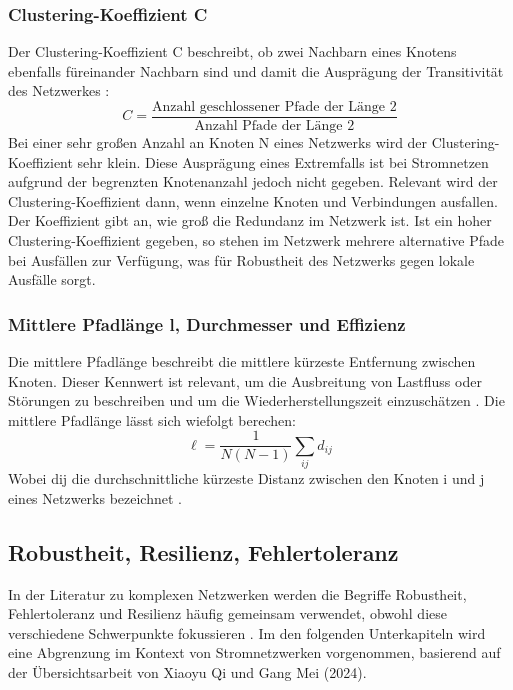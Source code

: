 \subsubsection{Clustering-Koeffizient C} 
Der Clustering-Koeffizient C beschreibt, ob zwei Nachbarn eines Knotens ebenfalls füreinander Nachbarn sind  und damit die Ausprägung der Transitivität des Netzwerkes : 
\[
C = \frac{\text{Anzahl geschlossener Pfade der L\"ange 2}}{\text{Anzahl Pfade der L\"ange 2}}
\]
Bei einer sehr großen Anzahl an Knoten N eines Netzwerks wird der Clustering-Koeffizient sehr klein. Diese Ausprägung eines Extremfalls ist bei Stromnetzen aufgrund der begrenzten Knotenanzahl jedoch nicht gegeben. Relevant wird der Clustering-Koeffizient dann, wenn einzelne Knoten und Verbindungen ausfallen. Der Koeffizient gibt an, wie groß die Redundanz im Netzwerk ist. Ist ein hoher Clustering-Koeffizient gegeben, so stehen im Netzwerk mehrere alternative Pfade bei Ausfällen zur Verfügung, was für Robustheit des Netzwerks gegen lokale Ausfälle sorgt. 
\subsubsection{Mittlere Pfadlänge l, Durchmesser und Effizienz}
Die mittlere Pfadlänge beschreibt die mittlere kürzeste Entfernung zwischen Knoten. Dieser Kennwert ist relevant, um die Ausbreitung von Lastfluss oder Störungen zu beschreiben und um die Wiederherstellungszeit einzuschätzen . Die mittlere Pfadlänge lässt sich wiefolgt berechen:
\[
\ell = \frac{1}{N(N-1)} \sum_{i j} d_{i j}
\]
Wobei dij die durchschnittliche kürzeste Distanz zwischen den Knoten i und j eines Netzwerks bezeichnet . 
\subsection{Robustheit, Resilienz, Fehlertoleranz}
In der Literatur zu komplexen Netzwerken werden die Begriffe Robustheit, Fehlertoleranz und Resilienz häufig gemeinsam verwendet, obwohl diese verschiedene Schwerpunkte fokussieren . Im den folgenden Unterkapiteln wird eine Abgrenzung im Kontext von Stromnetzwerken vorgenommen, basierend auf der Übersichtsarbeit von Xiaoyu Qi und Gang Mei (2024). 
